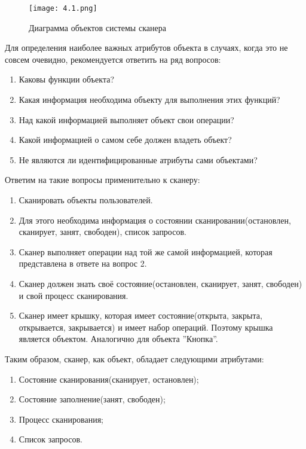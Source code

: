 \documentclass[12pt]{article}
\begin{document}
    \begin{figure}[h]
        \texttt{[image: 4.1.png]}
        \centering
        \caption{Диаграмма объектов системы сканера}
    \end{figure}

    Для определения наиболее важных атрибутов объекта в случаях, когда это не совсем очевидно, рекомендуется ответить на ряд вопросов:

    \begin{enumerate}
        \item Каковы функции объекта?
        \item Какая информация необходима объекту для выполнения этих функций?
        \item Над какой информацией выполняет объект свои операции?
        \item Какой информацией о самом себе должен владеть объект?
        \item Не являются ли идентифицированные атрибуты сами объектами?
    \end{enumerate}

    Ответим на такие вопросы применительно к сканеру:

    \begin{enumerate}
        \item Сканировать объекты пользователей.
        \item Для этого необходима информация о состоянии сканировании(остановлен, сканирует, занят, свободен), список запросов.
        \item Сканер выполняет операции над той же самой информацией, которая представлена в ответе на вопрос 2.
        \item Сканер должен знать своё состояние(остановлен, сканирует, занят, свободен) и свой процесс сканирования.
        \item Сканер имеет крышку, которая имеет состояние(открыта, закрыта, открывается, закрывается) и имеет набор операций. Поэтому крышка является объектом. Аналогично для объекта ''Кнопка''.
    \end{enumerate}

    Таким образом, сканер, как объект, обладает следующими атрибутами:

    \begin{enumerate}
        \item Состояние сканирования(сканирует, остановлен);
        \item Состояние заполнение(занят, свободен);
        \item Процесс сканирования;
        \item Список запросов.
    \end{enumerate}
\end{document}
